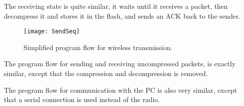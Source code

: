 The receiving state is quite similar, it waits until it receives a packet, then decompress it and stores it in the flash, and sends an ACK back to the sender.


\begin{figure}[H]
\centering
\texttt{[image: SendSeq]}
\caption{Simplified program flow for wireless transmission.}
\label{fig:SendReceiveSeq}
\end{figure}

The program flow for sending and receiving uncompressed packets, is exactly similar, except that the compression and decompression is removed.

The program flow for communication with the PC is also very similar, except that a serial connection is used instead of the radio.